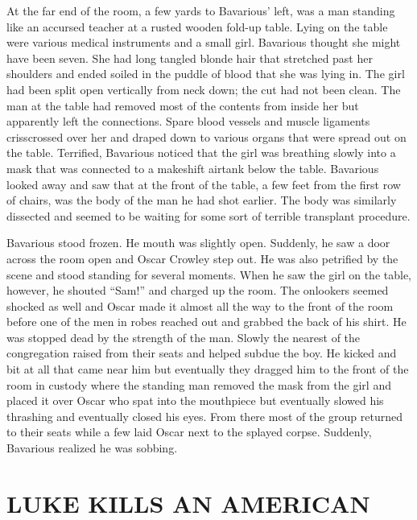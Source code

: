 At the far end of the room, a few yards to Bavarious' left,
was a man standing like an accursed teacher at a rusted wooden
fold-up table. Lying on the table were various medical instruments
and a small girl. Bavarious thought she might have been seven. She
had long tangled blonde hair that stretched past her shoulders and
ended soiled in the puddle of blood that she was lying in. The girl
had been split open vertically from neck down; the cut had not been
clean. The man at the table had removed most of the contents from
inside her but apparently left the connections. Spare blood vessels
and muscle ligaments crisscrossed over her and draped down to
various organs that were spread out on the table. Terrified,
Bavarious noticed that the girl was breathing slowly into a mask
that was connected to a makeshift airtank below the table.
Bavarious looked away and saw that at the front of the table, a few
feet from the first row of chairs, was the body of the man he had
shot earlier. The body was similarly dissected and seemed to be
waiting for some sort of terrible transplant procedure.



Bavarious stood frozen. He mouth was slightly open. Suddenly, he
saw a door across the room open and Oscar Crowley step out. He was
also petrified by the scene and stood standing for several moments.
When he saw the girl on the table, however, he shouted
``Sam!'' and charged up the room. The onlookers seemed
shocked as well and Oscar made it almost all the way to the front
of the room before one of the men in robes reached out and grabbed
the back of his shirt. He was stopped dead by the strength of the
man. Slowly the nearest of the congregation raised from their seats
and helped subdue the boy. He kicked and bit at all that came near
him but eventually they dragged him to the front of the room in
custody where the standing man removed the mask from the girl and
placed it over Oscar who spat into the mouthpiece but eventually
slowed his thrashing and eventually closed his eyes. From there
most of the group returned to their seats while a few laid Oscar
next to the splayed corpse. Suddenly, Bavarious realized he was
sobbing. 
 





\chapter{ LUKE KILLS AN AMERICAN}

